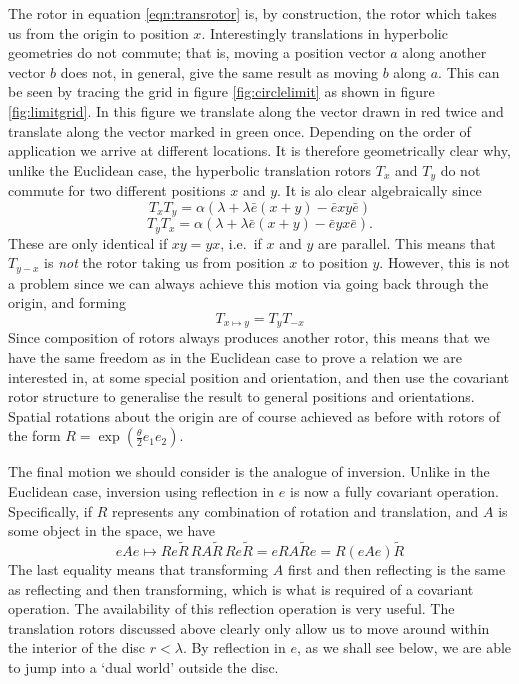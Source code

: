 The rotor in equation \ref{eqn:transrotor} is, by construction, the rotor 
which takes us from the origin to position $x$. Interestingly translations in
hyperbolic geometries do not commute; that is, moving a position
vector $a$ along another vector $b$ does not, in general, give the same result
as moving $b$ along $a$. This can be seen by tracing the grid
in figure \ref{fig:circlelimit} as shown in figure \ref{fig:limitgrid}.
In this figure we translate along the vector drawn in red twice and translate
along the vector marked in green once. Depending on the order of application
we arrive at different locations.
It is therefore geometrically clear why,
unlike the Euclidean case, the hyperbolic translation rotors
$T_x$ and $T_y$ do not commute
for two different positions $x$ and $y$. 
It is alo clear algebraically since
\[
T_xT_y = \alpha(\lambda + \lambda\bar{e}(x+y) - \bar{e}xy\bar{e})
\]
\[
T_yT_x = \alpha(\lambda + \lambda\bar{e}(x+y) - \bar{e}yx\bar{e}).
\]
These are only identical if $xy = yx$, i.e.\ if $x$ and $y$ are parallel.
This means that
$T_{y-x}$ is {\em not} the rotor taking us from
position $x$ to position $y$. However, this is not a
problem since we can always achieve this motion via
going back through the origin, and forming
%
\begin{equation}
T_{x \mapsto y} = T_y T_{-x}
\end{equation}
%
Since composition of rotors always produces another
rotor, this means that we have the same freedom as in the
Euclidean case to prove a relation we are interested in,
at some special position and orientation, and then use
the covariant rotor structure to generalise the result to
general positions and orientations. Spatial rotations about the origin are
of course achieved as before with rotors of the form
$R=\exp\left(\frac{\theta}{2}e_1 e_2\right)$.

The final motion we should consider is the analogue of
inversion. Unlike in the Euclidean case, inversion using
reflection in $e$ is now a fully covariant operation.
Specifically, if $R$ represents any combination of
rotation and translation, and $A$ is some object in the
space, we have
%
\begin{equation}
eAe \mapsto Re\tilde{R}\, RA\tilde{R}\, Re\tilde{R} = e
RA\tilde{R} e = R(eAe) \tilde{R}
\end{equation}
%
The last equality means that transforming $A$ first and
then reflecting is the same as reflecting and then
transforming, which is what is required of a covariant
operation. The availability of this reflection operation
is very useful. The translation rotors discussed above
clearly only allow us to move around within the interior
of the disc $r<\lambda$. By reflection in $e$, as we
shall see below, we are able to jump into a `dual world'
outside the disc.

